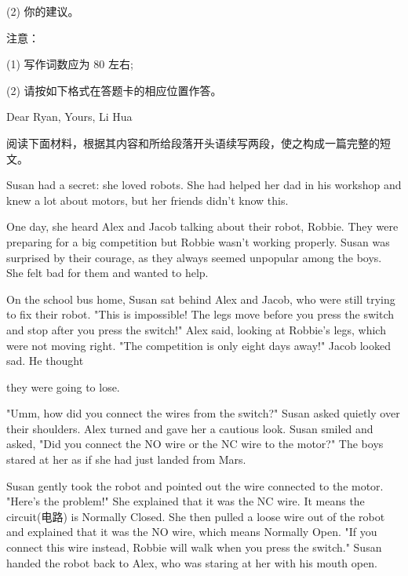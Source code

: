 \documentclass{英语试卷}
\begin{document}
\par (2) 你的建议。\par
\par 注意：\par
\par (1) 写作词数应为 80 左右;\par
\par (2) 请按如下格式在答题卡的相应位置作答。\par
\par Dear Ryan, Yours, Li Hua\par
{}
\par 阅读下面材料，根据其内容和所给段落开头语续写两段，使之构成一篇完整的短文。\par
\par Susan had a secret: she loved robots. She had helped her dad in his workshop and knew a lot about motors, but her friends didn't know this.\par
\par One day, she heard Alex and Jacob talking about their robot, Robbie. They were preparing for a big competition but Robbie wasn't working properly. Susan was surprised by their courage, as they always seemed unpopular among the boys. She felt bad for them and wanted to help.\par
\par On the school bus home, Susan sat behind Alex and Jacob, who were still trying to fix their robot. "This is impossible! The legs move before you press the switch and stop after you press the switch!" Alex said, looking at Robbie's legs, which were not moving right. "The competition is only eight days away!" Jacob looked sad. He thought\par
\par they were going to lose.\par
\par "Umm, how did you connect the wires from the switch?" Susan asked quietly over their shoulders. Alex turned and gave her a cautious look. Susan smiled and asked, "Did you connect the NO wire or the NC wire to the motor?" The boys stared at her as if she had just landed from Mars.\par
\par Susan gently took the robot and pointed out the wire connected to the motor. "Here’s the problem!" She explained that it was the NC wire. It means the circuit(电路) is Normally Closed. She then pulled a loose wire out of the robot and explained that it was the NO wire, which means Normally Open. "If you connect this wire instead, Robbie will walk when you press the switch." Susan handed the robot back to Alex, who was staring at her with his mouth open.\par
\end{document}
